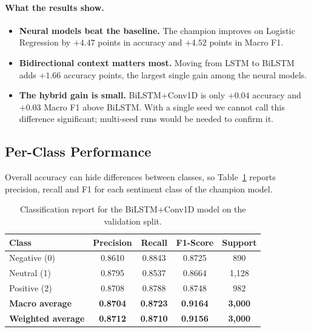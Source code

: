 \documentclass[11pt,a4paper]{article}
\begin{document}
\paragraph{What the results show.}
\begin{itemize}
    \item \textbf{Neural models beat the baseline.} The champion improves on Logistic Regression by $+4.47$ points in accuracy and $+4.52$ points in Macro F1.
    \item \textbf{Bidirectional context matters most.} Moving from LSTM to BiLSTM adds $+1.66$ accuracy points, the largest single gain among the neural models.
    \item \textbf{The hybrid gain is small.} BiLSTM+Conv1D is only $+0.04$ accuracy and $+0.03$ Macro F1 above BiLSTM. With a single seed we cannot call this difference significant; multi-seed runs would be needed to confirm it.
\end{itemize}

\subsection{Per-Class Performance}
Overall accuracy can hide differences between classes, so Table~\ref{tab:per_class} reports precision, recall and F1 for each sentiment class of the champion model.

\begin{table}[htbp]
\centering
\small
\begin{tabular}{lcccc}
\toprule
\textbf{Class} & \textbf{Precision} & \textbf{Recall} & \textbf{F1-Score} & \textbf{Support} \\
\midrule
Negative (0)  & 0.8610 & 0.8843 & 0.8725 & 890 \\
Neutral (1)   & 0.8795 & 0.8537 & 0.8664 & 1,128 \\
Positive (2)  & 0.8708 & 0.8788 & 0.8748 & 982 \\
\midrule
\textbf{Macro average}    & \textbf{0.8704} & \textbf{0.8723} & \textbf{0.9164} & \textbf{3,000} \\
\textbf{Weighted average} & \textbf{0.8712} & \textbf{0.8710} & \textbf{0.9156} & \textbf{3,000} \\
\bottomrule
\end{tabular}
\caption{Classification report for the BiLSTM+Conv1D model on the validation split.}
\label{tab:per_class}
\end{table}
\end{document}
